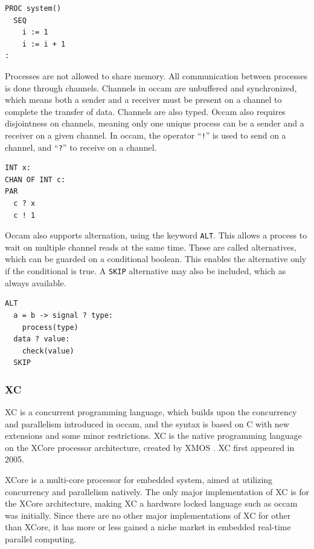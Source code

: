 \begin{lstlisting}[style={CustomC},frame={},numbers={none},xleftmargin={4em}]
PROC system()
  SEQ
    i := 1
    i := i + 1
:   
\end{lstlisting}

Processes are not allowed to share memory. All communication between processes is done through channels. Channels in occam are unbuffered and synchronized, which means both a sender and a receiver must be present on a channel to complete the transfer of data. Channels are also typed. Occam also requires disjointness on channels, meaning only one unique process can be a sender and a receiver on a given channel. In occam, the operator ``\texttt{!}'' is used to send on a channel, and ``\texttt{?}'' to receive on a channel.

\begin{lstlisting}[style={CustomC},frame={},numbers={none},xleftmargin={4em}]
INT x:
CHAN OF INT c:
PAR
  c ? x
  c ! 1
\end{lstlisting}

Occam also supports alternation, using the keyword \texttt{ALT}. This allows a process to wait on multiple channel reads at the same time. These are called alternatives, which can be guarded on a conditional boolean. This enables the alternative only if the conditional is true. A \texttt{SKIP} alternative may also be included, which as always available.

\begin{lstlisting}[style={CustomC},frame={},numbers={none},xleftmargin={4em}]
ALT
  a = b -> signal ? type:
    process(type)
  data ? value:
    check(value)
  SKIP
\end{lstlisting}


\subsubsection{XC}
\label{sssec:xc}

XC is a concurrent programming language, which builds upon the concurrency and parallelism introduced in occam, and the syntax is based on C with new extensions and some minor restrictions. XC is the native programming language on the XCore processor architecture, created by XMOS \citep{xc}. XC first appeared in 2005.

XCore is a multi-core processor for embedded system, aimed at utilizing concurrency and parallelism natively. The only major implementation of XC is for the XCore architecture, making XC a hardware locked language such as occam was initially. Since there are no other major implementations of XC for other than XCore, it has more or less gained a niche market in embedded real-time parallel computing.

